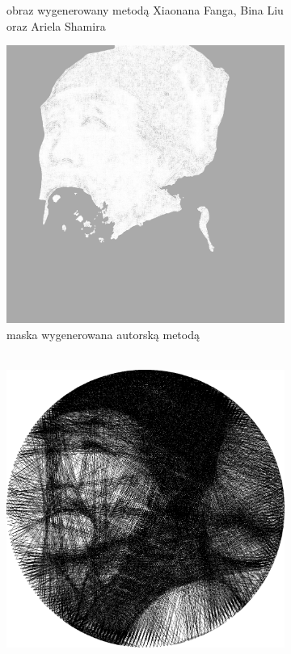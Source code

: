 \begin{figure}[H]
\begin{subfigure}{0.24\textwidth}
            \caption{obraz wygenerowany metodą Xiaonana Fanga, Bina Liu oraz Ariela Shamira}
            \label{comp-comp-dufu-gogh-b}
        \end{subfigure}
        \begin{subfigure}{0.24\textwidth}
            \centering
            \includegraphics[width = \textwidth]{img/6-comp/dufu_mask_c15_inv0_bg10_obj5_ed5.png}
            \caption{maska wygenerowana autorską metodą\\\hphantom{ }\\\hphantom{ }}
            \label{comp-comp-dufu-gogh-c}
        \end{subfigure}
        \begin{subfigure}{0.24\textwidth}
            \centering
            \includegraphics[width = \textwidth]{img/6-comp/dufu_e_i3000_c15_inv0_bg10_obj5_ed5.png}

\end{subfigure}
\end{figure}
